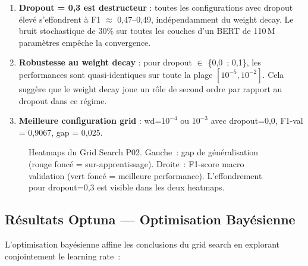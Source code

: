 \documentclass[12pt,a4paper]{article}
\begin{document}
\begin{enumerate}
  \item \textbf{Dropout = 0,3 est destructeur} : toutes les configurations avec
    dropout élevé s'effondrent à F1 $\approx$ 0,47--0,49, indépendamment du weight
    decay. Le bruit stochastique de 30\% sur toutes les couches d'un BERT de
    110\,M paramètres empêche la convergence.

  \item \textbf{Robustesse au weight decay} : pour dropout $\in$ \{0,0~; 0,1\},
    les performances sont quasi-identiques sur toute la plage $[10^{-5}, 10^{-2}]$.
    Cela suggère que le weight decay joue un rôle de second ordre par rapport au
    dropout dans ce régime.

  \item \textbf{Meilleure configuration grid} : wd=$10^{-4}$ ou $10^{-3}$ avec
    dropout=0,0, F1-val = 0,9067, gap = 0,025.
\end{enumerate}

\begin{figure}[H]
  \centering
  \caption{Heatmaps du Grid Search P02. Gauche~: gap de généralisation
    (rouge foncé = sur-apprentissage). Droite~: F1-score macro validation
    (vert foncé = meilleure performance). L'effondrement pour dropout=0,3
    est visible dans les deux heatmaps.}
  \label{fig:heatmap_p02}
\end{figure}

\subsection{Résultats Optuna — Optimisation Bayésienne}
\label{ssec:optuna_results}

L'optimisation bayésienne affine les conclusions du grid search en explorant
conjointement le learning rate~:
\end{document}
